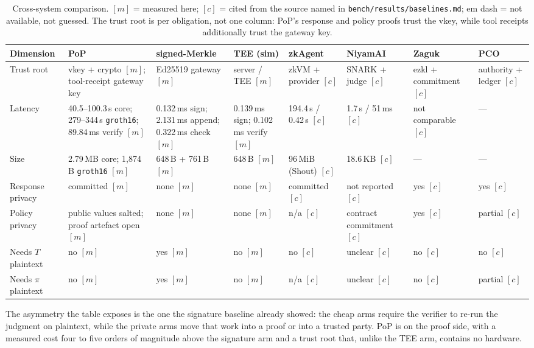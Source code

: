 \documentclass[10pt,journal,compsoc]{IEEEtran}
\newcommand{\tabfont}{\footnotesize}
\begin{document}
\begin{table}[t]
\centering
\caption{Cross-system comparison. $[m]$ = measured here; $[c]$ = cited from the
source named in \texttt{bench/results/baselines.md}; em dash = not available,
not guessed. The trust root is per obligation, not one column: PoP's response
and policy proofs trust the vkey, while tool receipts additionally trust the
gateway key.}
\label{tab:baselines}
\tabfont
\setlength{\tabcolsep}{3pt}
\scriptsize
\begin{tabular}{@{}L{0.11\textwidth}L{0.13\textwidth}L{0.13\textwidth}L{0.12\textwidth}L{0.11\textwidth}L{0.10\textwidth}L{0.10\textwidth}L{0.08\textwidth}@{}}
\toprule
Dimension & PoP & signed-Merkle & TEE (sim) & zkAgent & NiyamAI & Zaguk & PCO \\
\midrule
Trust root & vkey + crypto $[m]$; tool-receipt gateway key & Ed25519 gateway $[m]$ &
server / TEE $[m]$ & zkVM + provider $[c]$ & SNARK + judge $[c]$ &
ezkl + commitment $[c]$ & authority + ledger $[c]$ \\
Latency & 40.5--100.3\,s core; 279--344\,s \texttt{gr\-oth16}; 89.84\,ms verify $[m]$ &
0.132\,ms sign; 2.131\,ms append; 0.322\,ms check $[m]$ &
0.139\,ms sign; 0.102\,ms verify $[m]$ &
194.4\,s / 0.42\,s $[c]$ & 1.7\,s / 51\,ms $[c]$ &
not comparable $[c]$ & --- \\
Size & 2.79\,MB core; 1{,}874\,B \texttt{gr\-oth16} $[m]$ & 648\,B + 761\,B $[m]$ &
648\,B $[m]$ & 96\,MiB (Shout) $[c]$ & 18.6\,KB $[c]$ & --- & --- \\
Response privacy & committed $[m]$ & none $[m]$ & none $[m]$ &
committed $[c]$ & not reported $[c]$ & yes $[c]$ & yes $[c]$ \\
Policy privacy & public values salted; proof artefact open $[m]$ & none $[m]$ & none $[m]$ &
n/a $[c]$ & contract commitment $[c]$ & yes $[c]$ & partial $[c]$ \\
Needs $T$ plaintext & no $[m]$ & yes $[m]$ & no $[m]$ & no $[c]$ &
unclear $[c]$ & no $[c]$ & no $[c]$ \\
Needs $\pi$ plaintext & no $[m]$ & yes $[m]$ & no $[m]$ & n/a $[c]$ &
unclear $[c]$ & no $[c]$ & partial $[c]$ \\
\bottomrule
\end{tabular}
\end{table}

The asymmetry the table exposes is the one the signature baseline already
showed: the cheap arms require the verifier to re-run the judgment on plaintext,
while the private arms move that work into a proof or into a trusted party. PoP
is on the proof side, with a measured cost four to five orders of magnitude
above the signature arm and a trust root that, unlike the TEE arm, contains no
hardware.
\end{document}
